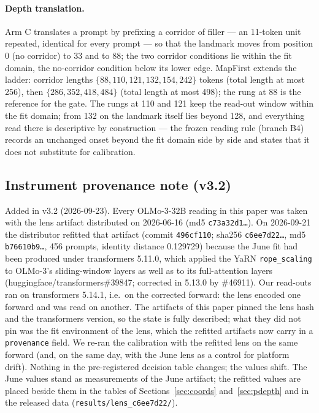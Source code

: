 \documentclass[11pt]{article}
\begin{document}
\paragraph{Depth translation.} Arm C translates a prompt by prefixing a corridor of filler --- an 11-token unit repeated, identical for every prompt --- so that the landmark moves from position 0 (no corridor) to 33 and to 88; the two corridor conditions lie within the fit domain, the no-corridor condition below its lower edge. MapFirst extends the ladder: corridor lengths $\{88, 110, 121, 132, 154, 242\}$ tokens (total length at most 256), then $\{286, 352, 418, 484\}$ (total length at most 498); the rung at 88 is the reference for the gate. The rungs at 110 and 121 keep the read-out window within the fit domain; from 132 on the landmark itself lies beyond 128, and everything read there is descriptive by construction --- the frozen reading rule (branch B4) records an unchanged onset beyond the fit domain side by side and states that it does not substitute for calibration.

\subsection{Instrument provenance note (v3.2)}
\label{sec:provenance-note}

Added in v3.2 (2026-09-23). Every OLMo-3-32B reading in this paper was taken with the lens artifact distributed on 2026-06-16 (md5 \texttt{c73a32d1\ldots}). On 2026-09-21 the distributor refitted that artifact (commit \texttt{496cf110}; sha256 \texttt{c6ee7d22\ldots}, md5 \texttt{b76610b9\ldots}, 456 prompts, identity distance 0.129729) because the June fit had been produced under transformers 5.11.0, which applied the YaRN \texttt{rope\_scaling} to OLMo-3's sliding-window layers as well as to its full-attention layers (huggingface/transformers\#39847; corrected in 5.13.0 by \#46911). Our read-outs ran on transformers 5.14.1, i.e.\ on the corrected forward: the lens encoded one forward and was read on another. The artifacts of this paper pinned the lens hash and the transformers version, so the state is fully described; what they did not pin was the fit environment of the lens, which the refitted artifacts now carry in a \texttt{provenance} field. We re-ran the calibration with the refitted lens on the same forward (and, on the same day, with the June lens as a control for platform drift). Nothing in the pre-registered decision table changes; the values shift. The June values stand as measurements of the June artifact; the refitted values are placed beside them in the tables of Sections~\ref{sec:coords} and~\ref{sec:pdepth} and in the released data (\texttt{results/lens\_c6ee7d22/}).
\end{document}
